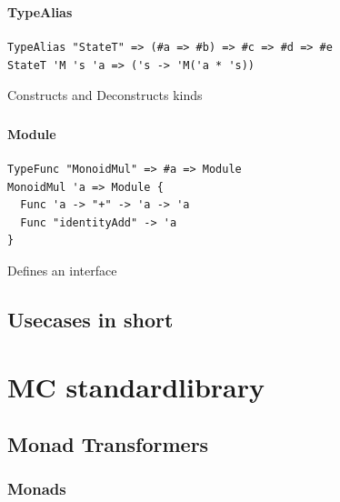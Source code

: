 \begin{frame}[fragile]
   \frametitle{\subsecname}
   \framesubtitle{TypeAlias}

   \begin{lstlisting}
TypeAlias "StateT" => (#a => #b) => #c => #d => #e
StateT 'M 's 'a => ('s -> 'M('a * 's))
   \end{lstlisting}
   Constructs and Deconstructs kinds
\end{frame}

\begin{frame}[fragile]
   \frametitle{\subsecname}
   \framesubtitle{Module}

   \begin{lstlisting}
TypeFunc "MonoidMul" => #a => Module
MonoidMul 'a => Module {
  Func 'a -> "+" -> 'a -> 'a
  Func "identityAdd" -> 'a
}
   \end{lstlisting}
   Defines an interface
\end{frame}

\subsection{Usecases in short}

\section{MC standardlibrary}
\subsection{Monad Transformers}
\subsubsection{Monads}

